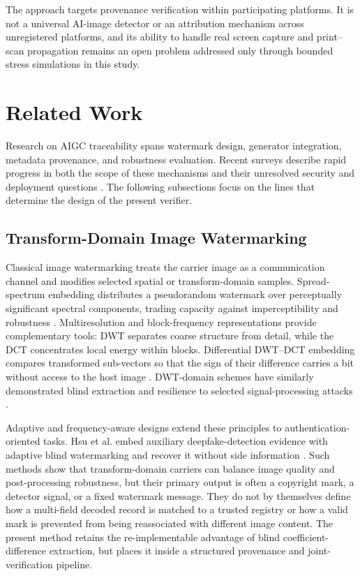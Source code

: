 \documentclass[a4paper,fleqn]{cas-sc}
\begin{document}
The approach targets provenance verification within participating platforms.
It is not a universal AI-image detector or an attribution mechanism across
unregistered platforms, and its ability to handle real screen capture and
print--scan propagation remains an open problem addressed only through bounded
stress simulations in this study.

\section{Related Work}\label{sec:related}

Research on AIGC traceability spans watermark design, generator integration,
metadata provenance, and robustness evaluation. Recent surveys describe rapid
progress in both the scope of these mechanisms and their unresolved security
and deployment questions \cite{cao_secure_2026,zhao_sok_2025,liu_review_2024,sun_generated_image_watermark_review_2026}.
The following subsections focus on the lines that determine the design of the
present verifier.

\subsection{Transform-Domain Image Watermarking}
Classical image watermarking treats the carrier image as a communication
channel and modifies selected spatial or transform-domain samples.
Spread-spectrum embedding distributes a pseudorandom watermark over perceptually
significant spectral components, trading capacity against imperceptibility and
robustness \cite{cox_secure_1997}. Multiresolution and block-frequency
representations provide complementary tools: DWT separates coarse structure
from detail, while the DCT concentrates local energy within blocks. Differential
DWT--DCT embedding compares transformed sub-vectors so that the sign of their
difference carries a bit without access to the host image
\cite{benoraira_blind_2015}. DWT-domain schemes have similarly demonstrated
blind extraction and resilience to selected signal-processing attacks
\cite{najafi_robust_2017}.

Adaptive and frequency-aware designs extend these principles to
authentication-oriented tasks. Hsu et al. embed auxiliary deepfake-detection
evidence with adaptive blind watermarking and recover it without side
information \cite{hsu_ai-assisted_2024}. Such methods show that transform-domain
carriers can balance image quality and post-processing robustness, but their
primary output is often a copyright mark, a detector signal, or a fixed
watermark message. They do not by themselves define how a multi-field decoded
record is matched to a trusted registry or how a valid mark is prevented from
being reassociated with different image content. The present method retains
the re-implementable advantage of blind coefficient-difference extraction, but
places it inside a structured provenance and joint-verification pipeline.
\end{document}
